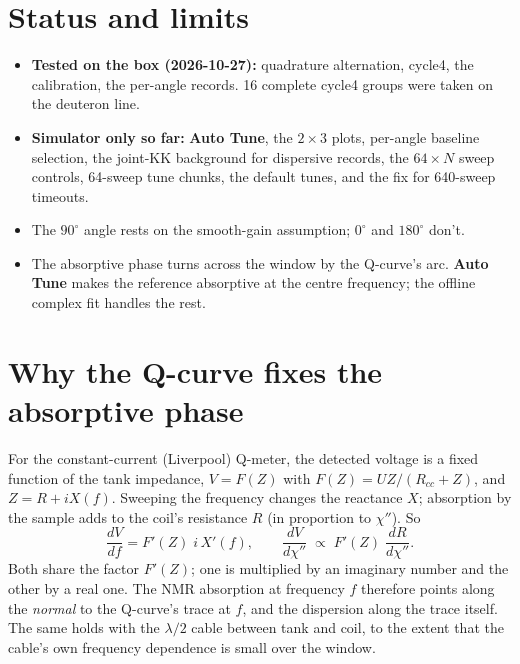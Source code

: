 \documentclass[11pt]{article}
\newcommand{\btn}[1]{\textsf{\textbf{#1}}}   %
\begin{document}
\section{Status and limits}
\begin{itemize}
\item \textbf{Tested on the box (2026-10-27):} quadrature alternation, cycle4, the calibration, the per-angle
  records. 16 complete cycle4 groups were taken on the deuteron line.
\item \textbf{Simulator only so far:} \btn{Auto Tune}, the $2\times3$ plots, per-angle baseline selection, the joint-KK
  background for dispersive records, the $64\times N$ sweep controls, 64-sweep tune chunks, the default tunes, and
  the fix for 640-sweep timeouts.
\item The $90^\circ$ angle rests on the smooth-gain assumption; $0^\circ$ and $180^\circ$ don't.
\item The absorptive phase turns across the window by the Q-curve's arc. \btn{Auto Tune} makes the reference
  absorptive at the centre frequency; the offline complex fit handles the rest.
\end{itemize}

\appendix
\section{Why the Q-curve fixes the absorptive phase}
\label{app:normal}

For the constant-current (Liverpool) Q-meter, the detected voltage is a fixed function of the tank impedance,
$V=F(Z)$ with $F(Z)=U Z/(R_{cc}+Z)$, and $Z=R+iX(f)$. Sweeping the frequency changes the reactance $X$;
absorption by the sample adds to the coil's resistance $R$ (in proportion to $\chi''$). So
\begin{equation}
  \frac{dV}{df}=F'(Z)\; i\,X'(f), \qquad \frac{dV}{d\chi''}\;\propto\;F'(Z)\;\frac{dR}{d\chi''}.
\end{equation}
Both share the factor $F'(Z)$; one is multiplied by an imaginary number and the other by a real one. The NMR
absorption at frequency $f$ therefore points along the \emph{normal} to the Q-curve's trace at $f$, and the
dispersion along the trace itself. The same holds with the $\lambda/2$ cable between tank and coil, to the
extent that the cable's own frequency dependence is small over the window.
\end{document}
